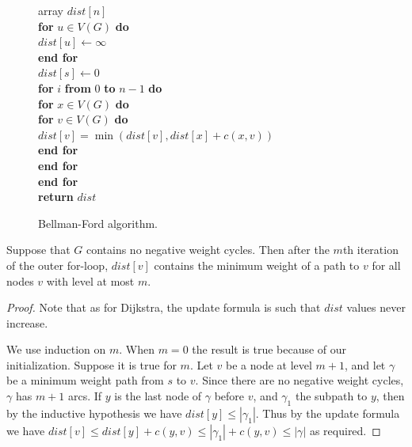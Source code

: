 \begin{figure}
\label{fig:bellford-code}

{
array $dist[n]$ \\

\textbf{for} $u \in V(G)$ \textbf{do} \\

\> $dist[u] \gets \infty$ \\

\textbf{end for} \\

$dist[s] \gets 0$ \\

\textbf{for} $i$ \textbf{from} $0$ \textbf{to} $n-1$ \textbf{do} \\

\> \textbf{for} $x \in V(G)$ \textbf{do}\\

\> \> \textbf{for} $v \in V(G)$ \textbf{do}\\

\> \> \> $dist[v] = \min( dist[v], dist[x] + c(x,v) )$ \\

\> \> \textbf{end for} \\

\> \textbf{end for} \\

\textbf{end for}\\

\textbf{return} $dist$ \\
}

\caption{Bellman-Ford algorithm.}

\end{figure}


\begin{Theorem} Suppose that $G$ contains no negative weight cycles. Then after the $m$th iteration of the outer for-loop, $dist[v]$ contains the minimum weight of a path to $v$ for all nodes $v$ with level at most $m$.

\end{Theorem}

\begin{proof} Note that as for Dijkstra, the update formula is such that $dist$ values never increase.

We use induction on $m$. When $m=0$ the  result is true because of our initialization. Suppose it is true for $m$. Let $v$ be a node at level $m+1$, and let $\gamma$ be a minimum weight path from $s$ to $v$. Since there are no negative weight cycles, $\gamma$ has $m+1$ arcs. If $y$ is the last node of $\gamma$ before $v$, and $\gamma_1$ the subpath to $y$, then by the inductive hypothesis we have $dist[y] \leq | \gamma_1 |$. Thus by the update formula we have $dist[v] \leq dist[y] + c(y, v) \leq | \gamma_1 | + c(y, v) \leq | \gamma |$ as required.

\end{proof}


